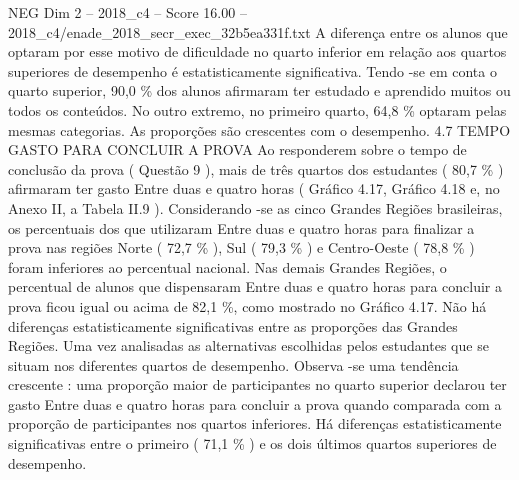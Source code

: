 \begin{textsample}{NEG Dim 2 – 2018\_c4 – Score 16.00 – 2018\_c4/enade\_2018\_secr\_exec\_32b5ea331f.txt}
A diferença entre os alunos que optaram por esse motivo de dificuldade no quarto inferior em relação aos quartos superiores de desempenho é estatisticamente significativa.
Tendo -se em conta o quarto superior, 90,0 \% dos alunos afirmaram ter estudado e aprendido muitos ou todos os conteúdos.
No outro extremo, no primeiro quarto, 64,8 \% optaram pelas mesmas categorias.
As proporções são crescentes com o desempenho. 4.7 TEMPO GASTO PARA CONCLUIR A PROVA Ao responderem sobre o tempo de conclusão da prova ( Questão 9 ), mais de três quartos dos estudantes ( 80,7 \% ) afirmaram ter gasto Entre duas e quatro horas ( Gráfico 4.17, Gráfico 4.18 e, no Anexo II, a Tabela II.9 ).
Considerando -se as cinco Grandes Regiões brasileiras, os percentuais dos que utilizaram Entre duas e quatro horas para finalizar a prova nas regiões Norte ( 72,7 \% ), Sul ( 79,3 \% ) e Centro-Oeste ( 78,8 \% ) foram inferiores ao percentual nacional.
Nas demais Grandes Regiões, o percentual de alunos que dispensaram Entre duas e quatro horas para concluir a prova ficou igual ou acima de 82,1 \%, como mostrado no Gráfico 4.17.
Não há diferenças estatisticamente significativas entre as proporções das Grandes Regiões.
Uma vez analisadas as alternativas escolhidas pelos estudantes que se situam nos diferentes quartos de desempenho.
Observa -se uma tendência crescente : uma proporção maior de participantes no quarto superior declarou ter gasto Entre duas e quatro horas para concluir a prova quando comparada com a proporção de participantes nos quartos inferiores.
Há diferenças estatisticamente significativas entre o primeiro ( 71,1 \% ) e os dois últimos quartos superiores de desempenho.

\end{textsample}
